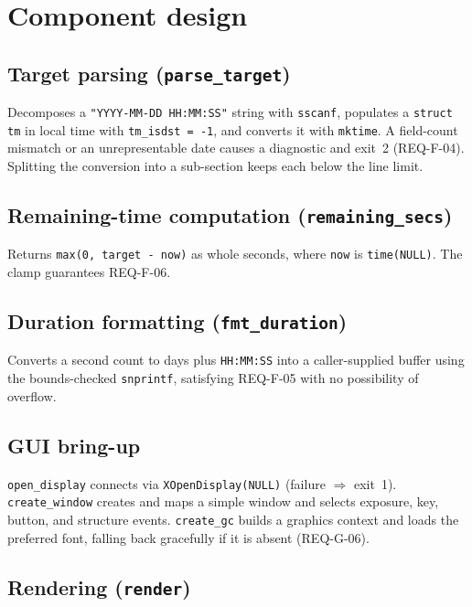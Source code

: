 \documentclass[12pt]{article}
\newcommand{\code}[1]{\texttt{#1}}
\begin{document}
\section{Component design}

\subsection{Target parsing (\code{parse\_target})}

Decomposes a \code{"YYYY-MM-DD HH:MM:SS"} string with \code{sscanf},
populates a \code{struct tm} in local time with \code{tm\_isdst = -1}, and
converts it with \code{mktime}.  A field-count mismatch or an
unrepresentable date causes a diagnostic and exit~2 (REQ-F-04).  Splitting
the conversion into a sub-section keeps each below the line limit.

\subsection{Remaining-time computation (\code{remaining\_secs})}

Returns \code{max(0, target - now)} as whole seconds, where \code{now} is
\code{time(NULL)}.  The clamp guarantees REQ-F-06.

\subsection{Duration formatting (\code{fmt\_duration})}

Converts a second count to days plus \code{HH:MM:SS} into a caller-supplied
buffer using the bounds-checked \code{snprintf}, satisfying REQ-F-05 with
no possibility of overflow.

\subsection{GUI bring-up}

\code{open\_display} connects via \code{XOpenDisplay(NULL)} (failure
$\Rightarrow$ exit~1).  \code{create\_window} creates and maps a simple
window and selects exposure, key, button, and structure events.
\code{create\_gc} builds a graphics context and loads the preferred font,
falling back gracefully if it is absent (REQ-G-06).

\subsection{Rendering (\code{render})}
\end{document}
